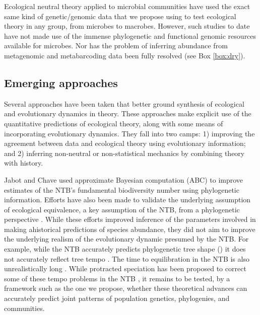 \documentclass[12pt]{article}
\newcounter{Box}
\begin{document}
Ecological neutral theory applied to microbial communities
\citep{Venkataraman2015-rk} have used the exact same kind of
genetic/genomic data that we propose using to test ecological theory
in any group, from microbes to macrobes. However, such studies to date
have not made use of the immense phylogenetic and functional genomic
resources available for microbes. Nor has the problem of inferring
abundance from metagenomic and metabarcoding data been fully resolved
(see Box \ref{box:dry}).

\subsection{Emerging approaches}

Several approaches have been taken that better ground synthesis of
ecological and evolutionary dynamics in theory. These approaches make
explicit use of the quantitative predictions of ecological theory,
along with some means of incorporating evolutionary dynamics. They
fall into two camps: 1) improving the agreement between data and
ecological theory using evolutionary information; and 2) inferring
non-neutral or non-statistical mechanics by combining theory with
history. 

Jabot and Chave \citep{Jabot2009-xr} used approximate Bayesian
computation (ABC) to improve estimates of the NTB's fundamental
biodiversity number using phylogenetic information. Efforts have also
been made to validate the underlying assumption of ecological
equivalence, a key assumption of the NTB, from a phylogenetic
perspective \citep{Burbrink2015-vx}. While these efforts improved
inference of the parameters involved in making ahistorical predictions
of species abundance, they did not aim to improve the underlying
realism of the evolutionary dynamic presumed by the NTB. For example,
while the NTB accurately predicts phylogenetic tree shape
(\citep{Jabot2009-xr}) it does not accurately reflect tree tempo
\citep{Davies2011-mz}. The time to equilibration in the NTB is also
unrealistically long \citep{Ricklefs2006-tn}. While protracted
speciation has been proposed to correct some of these tempo problems
in the NTB \citep{Rosindell2010-gq}, it remains to be tested, by a
framework such as the one we propose, whether these theoretical
advances can accurately predict joint patterns of population genetics,
phylogenies, and communities.
\end{document}
